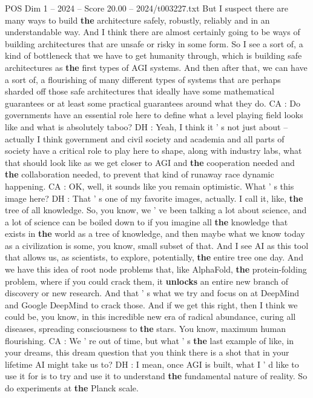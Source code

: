 \begin{textsample}{POS Dim 1 – 2024 – Score 20.00 – 2024/t003227.txt}
But I suspect there are many ways to build \textbf{the} architecture safely, robustly, reliably and in an understandable way.
And I think there are almost certainly going to be ways of building architectures that are unsafe or risky in some form.
So I see a sort of, a kind of bottleneck that we have to get humanity through, which is building safe architectures as \textbf{the} first types of AGI systems.
And then after that, we can have a sort of, a flourishing of many different types of systems that are perhaps sharded off those safe architectures that ideally have some mathematical guarantees or at least some practical guarantees around what they do.
CA : Do governments have an essential role here to define what a level playing field looks like and what is absolutely taboo?
DH : Yeah, I think it ' s not just about -- actually I think government and civil society and academia and all parts of society have a critical role to play here to shape, along with industry labs, what that should look like as we get closer to AGI and \textbf{the} cooperation needed and \textbf{the} collaboration needed, to prevent that kind of runaway race dynamic happening.
CA : OK, well, it sounds like you remain optimistic.
What ' s this image here?
DH : That ' s one of my favorite images, actually.
I call it, like, \textbf{the} tree of all knowledge.
So, you know, we ' ve been talking a lot about science, and a lot of science can be boiled down to if you imagine all \textbf{the} knowledge that exists in \textbf{the} world as a tree of knowledge, and then maybe what we know today as a civilization is some, you know, small subset of that.
And I see AI as this tool that allows us, as scientists, to explore, potentially, \textbf{the} entire tree one day.
And we have this idea of root node problems that, like AlphaFold, \textbf{the} protein-folding problem, where if you could crack them, it \textbf{unlocks} an entire new branch of discovery or new research.
And that ' s what we try and focus on at DeepMind and Google DeepMind to crack those.
And if we get this right, then I think we could be, you know, in this incredible new era of radical abundance, curing all diseases, spreading consciousness to \textbf{the} stars.
You know, maximum human flourishing.
CA : We ' re out of time, but what ' s \textbf{the} last example of like, in your dreams, this dream question that you think there is a shot that in your lifetime AI might take us to?
DH : I mean, once AGI is built, what I ' d like to use it for is to try and use it to understand \textbf{the} fundamental nature of reality.
So do experiments at \textbf{the} Planck scale.

\end{textsample}
